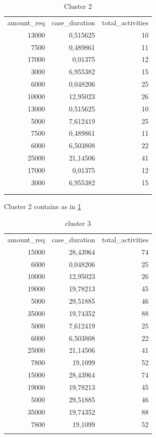 \documentclass{article}
\begin{document}
\begin{table}[ht]
  \centering
    \caption{Cluster 2}
    \begin{tabular}{rrr}
    \multicolumn{1}{l}{amount\_req} & \multicolumn{1}{l}{case\_duration} & \multicolumn{1}{l}{total\_activities} \\
    13000 & 0,515625 & 10 \\
    7500  & 0,489861 & 11 \\
    17000 & 0,01375 & 12 \\
    3000  & 6,955382 & 15 \\
    6000  & 0,048206 & 25 \\
    10000 & 12,95023 & 26 \\
    13000 & 0,515625 & 10 \\
    5000  & 7,612419 & 25 \\
    7500  & 0,489861 & 11 \\
    6000  & 6,503808 & 22 \\
    25000 & 21,14506 & 41 \\
    17000 & 0,01375 & 12 \\
    3000  & 6,955382 & 15 \\
          &       &  \\
          &       &  \\
    \end{tabular}%
  \label{tab:clust2}%
\end{table}%
Cluster 2 contains as in \ref{tab:clust2}


\begin{table}[ht]
  \centering
  \caption{cluster 3}
    \begin{tabular}{rrr}
    \multicolumn{1}{l}{amount\_req} & \multicolumn{1}{l}{case\_duration} & \multicolumn{1}{l}{total\_activities} \\
    15000 & 28,43964 & 74 \\
    6000  & 0,048206 & 25 \\
    10000 & 12,95023 & 26 \\
    19000 & 19,78213 & 45 \\
    5000  & 29,51885 & 46 \\
    35000 & 19,74352 & 88 \\
    5000  & 7,612419 & 25 \\
    6000  & 6,503808 & 22 \\
    25000 & 21,14506 & 41 \\
    7800  & 19,1099 & 52 \\
    15000 & 28,43964 & 74 \\
    19000 & 19,78213 & 45 \\
    5000  & 29,51885 & 46 \\
    35000 & 19,74352 & 88 \\
    7800  & 19,1099 & 52 \\
          &       &  \\
    \end{tabular}%
  \label{tab:clust3}%
\end{table}%
\end{document}
